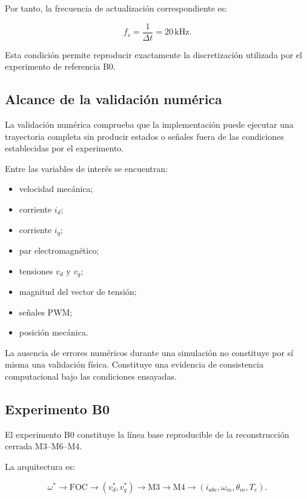 Por tanto, la frecuencia de actualización correspondiente es:

\begin{equation}
f_s=
\frac{1}{\Delta t}
=
20\,\mathrm{kHz}.
\end{equation}

Esta condición permite reproducir exactamente la discretización utilizada por el experimento de referencia B0.

\subsection{Alcance de la validación numérica}

La validación numérica comprueba que la implementación puede ejecutar una trayectoria completa sin producir estados o señales fuera de las condiciones establecidas por el experimento.

Entre las variables de interés se encuentran:

\begin{itemize}
    \item velocidad mecánica;
    \item corriente $i_d$;
    \item corriente $i_q$;
    \item par electromagnético;
    \item tensiones $v_d$ y $v_q$;
    \item magnitud del vector de tensión;
    \item señales PWM;
    \item posición mecánica.
\end{itemize}

La ausencia de errores numéricos durante una simulación no constituye por sí misma una validación física. Constituye una evidencia de consistencia computacional bajo las condiciones ensayadas.

\subsection{Experimento B0}

El experimento B0 constituye la línea base reproducible de la reconstrucción cerrada M3--M6--M4.

La arquitectura es:

\begin{equation}
\omega^\ast
\rightarrow
\mathrm{FOC}
\rightarrow
(v_d^\ast,v_q^\ast)
\rightarrow
\mathrm{M3}
\rightarrow
\mathrm{M4}
\rightarrow
(i_{abc},\omega_m,\theta_m,T_e).
\end{equation}

